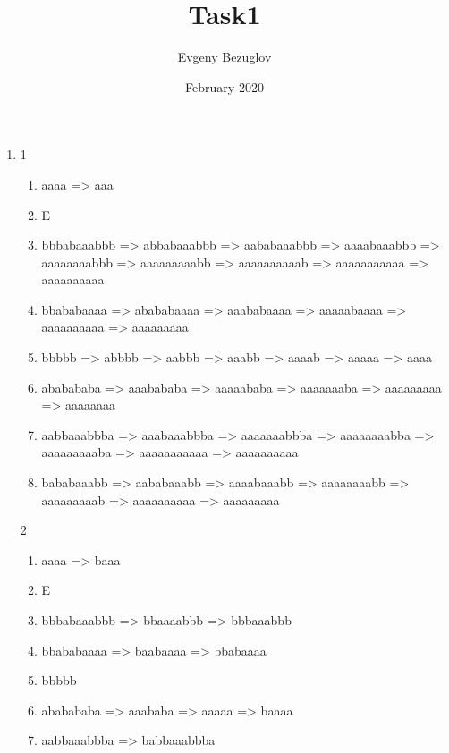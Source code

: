\documentclass{article}
\title{Task1}
\author{Evgeny Bezuglov }
\date{February 2020}
\begin{document}
\maketitle





\begin{enumerate}
\item 1
\begin{enumerate}
\item  aaaa => aaa

\item E

\item bbbabaaabbb => abbabaaabbb => aababaaabbb => aaaabaaabbb => aaaaaaaabbb => aaaaaaaaabb => aaaaaaaaaab => aaaaaaaaaaa => aaaaaaaaaa

\item bbababaaaa => abababaaaa => aaababaaaa => aaaaabaaaa => aaaaaaaaaa => aaaaaaaaa

\item bbbbb => abbbb => aabbb => aaabb => aaaab => aaaaa => aaaa

\item ababababa => aaabababa => aaaaababa => aaaaaaaba => aaaaaaaaa => aaaaaaaa

\item aabbaaabbba => aaabaaabbba => aaaaaaabbba => aaaaaaaabba => aaaaaaaaaba => aaaaaaaaaaa => aaaaaaaaaa

\item bababaaabb => aababaaabb => aaaabaaabb => aaaaaaaabb => aaaaaaaaab => aaaaaaaaaa => aaaaaaaaa

\end{enumerate}

2
\begin{enumerate}
\item aaaa => baaa

\item E

\item bbbabaaabbb => bbaaaabbb => bbbaaabbb

\item bbababaaaa => baabaaaa => bbabaaaa

\item bbbbb

\item ababababa => aaababa => aaaaa => baaaa

\item aabbaaabbba => babbaaabbba


\end{enumerate}
\end{enumerate}
\end{document}
